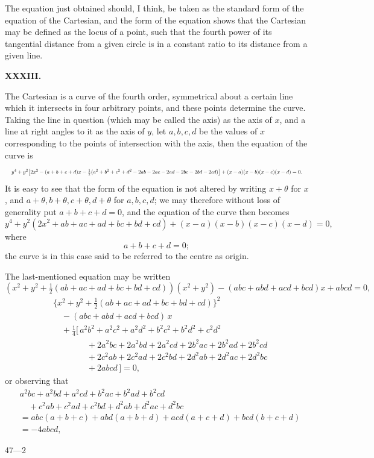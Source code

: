 \documentclass[11pt]{article}
\begin{document}
\newpage

The equation just obtained should, I think, be taken as the standard form of the equation of the Cartesian, and the form of the equation shows that the Cartesian may be defined as the locus of a point, such that the fourth power of its tangential distance from a given circle is in a constant ratio to its distance from a given line.

\bigskip
\begin{center}\textbf{XXXIII.}\end{center}
The Cartesian is a curve of the fourth order, symmetrical about a certain line which it intersects in four arbitrary points, and these points determine the curve. Taking the line in question (which may be called the axis) as the axis of $x$, and a line at right angles to it as the axis of $y$, let $a,b,c,d$ be the values of $x$ corresponding to the points of intersection with the axis, then the equation of the curve is
\[
\resizebox{\textwidth}{!}{$\displaystyle
y^4 + y^2\bigl[2x^2 - (a+b+c+d)x - \tfrac{1}{2}(a^2 + b^2 + c^2 + d^2 - 2ab - 2ac - 2ad - 2bc - 2bd - 2cd)\bigr] + (x-a)(x-b)(x-c)(x-d) = 0.$}
\]
It is easy to see that the form of the equation is not altered by writing $x + \theta$ for $x$, and $a + \theta, b + \theta, c + \theta, d + \theta$ for $a, b, c, d$; we may therefore without loss of generality put $a + b + c + d = 0$, and the equation of the curve then becomes
\[
y^4 + y^2(2x^2 + ab + ac + ad + bc + bd + cd) + (x-a)(x-b)(x-c)(x-d) = 0,
\]
where
\[
a + b + c + d = 0;
\]
the curve is in this case said to be referred to the centre as origin.

The last-mentioned equation may be written
\[
(x^2 + y^2 + \tfrac{1}{2}(ab + ac + ad + bc + bd + cd))(x^2 + y^2) - (abc + abd + acd + bcd)x + abcd = 0,
\]
\begin{align*}
&\{x^2 + y^2 + \tfrac{1}{2}(ab + ac + ad + bc + bd + cd)\}^2 \\
&\quad - (abc + abd + acd + bcd)\,x \\
&\quad + \tfrac{1}{4}\bigl[\, a^2 b^2 + a^2 c^2 + a^2 d^2 + b^2 c^2 + b^2 d^2 + c^2 d^2 \\
&\qquad\qquad + 2 a^2 bc + 2 a^2 bd + 2 a^2 cd + 2 b^2 ac + 2 b^2 ad + 2 b^2 cd \\
&\qquad\qquad + 2 c^2 ab + 2 c^2 ad + 2 c^2 bd + 2 d^2 ab + 2 d^2 ac + 2 d^2 bc \\
&\qquad\qquad + 2 abcd\,\bigr] = 0,
\end{align*}
or observing that
\begin{align*}
&a^2 bc + a^2 bd + a^2 cd + b^2 ac + b^2 ad + b^2 cd \\
&\quad + c^2 ab + c^2 ad + c^2 bd + d^2 ab + d^2 ac + d^2 bc \\
&= abc(a + b + c) + abd(a + b + d) + acd(a + c + d) + bcd(b + c + d) \\
&= -4 abcd,
\end{align*}

\hfill 47---2
\end{document}

